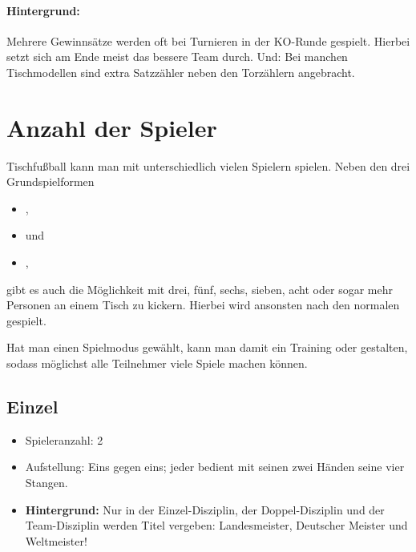 \paragraph{Hintergrund:}
Mehrere Gewinnsätze werden oft bei Turnieren in der KO-Runde gespielt. Hierbei setzt sich am Ende meist das bessere Team durch. 
Und: Bei manchen Tischmodellen sind extra Satzzähler neben den Torzählern angebracht. 




\section{Anzahl der Spieler}
\label{spielformen:npersonen}

Tischfußball kann man mit unterschiedlich vielen Spielern spielen. 
Neben den drei Grundspielformen 
\begin{itemize}
\item {},
\item {} und 
\item {}, 
\end{itemize}
gibt es auch die Möglichkeit mit drei, fünf, sechs, sieben, acht oder sogar mehr Personen an einem Tisch zu kickern.
Hierbei wird ansonsten nach den normalen  gespielt.

Hat man einen Spielmodus gewählt, kann man damit ein Training oder  gestalten, sodass möglichst alle Teilnehmer viele Spiele machen können. 


\subsection{Einzel}
\label{spielformen:npersonen:einzel}

\begin{itemize}
\item Spieleranzahl: 2
\item Aufstellung: Eins gegen eins; jeder bedient mit seinen zwei Händen seine vier Stangen.
\item {\normalfont \bfseries Hintergrund:} Nur in der Einzel-Disziplin, der Doppel-Disziplin und der Team-Disziplin werden Titel vergeben: Landesmeister, Deutscher Meister und Weltmeister!  
\end{itemize}
 
